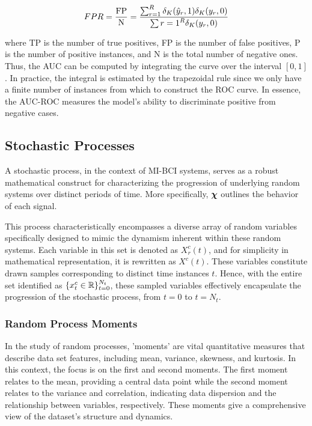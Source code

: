 \begin{equation}
    FPR = \frac{\text{FP}}{\text{N}} = \frac{\sum_{r=1}^{R} \delta_{K}( \hat{y}_r ,  1 )\delta_{K}( y_r , 0 )}{\sum{r=1}^{R} \delta_{K}( y_r , 0 )}
\end{equation}

where TP is the number of true positives, FP is the number of false positives, P is the number of positive instances, and N is the total number of negative ones. Thus, the AUC can be computed by integrating the curve over the interval $[0,1]$. In practice, the integral is estimated by the trapezoidal rule since we only have a finite number of instances from which to construct the ROC curve. In essence, the AUC-ROC measures the model's ability to discriminate positive from negative cases.

\subsection{Stochastic Processes}

A stochastic process, in the context of MI-BCI systems, serves as a robust mathematical construct for characterizing the progression of underlying random systems over distinct periods of time. More specifically, $\bm {\chi}$ outlines the behavior of each signal. 

This process characteristically encompasses a diverse array of random variables specifically designed to mimic the dynamism inherent within these random systems. Each variable in this set is denoted as $X^c_r(t)$, and for simplicity in mathematical representation, it is rewritten as $X^c(t)$. These variables constitute drawn samples corresponding to distinct time instances $t$. Hence, with the entire set identified as $\{{x}^{c}_{t} \in \mathbb{R}\}_{t=0}^{N_t}$, these sampled variables effectively encapsulate the progression of the stochastic process, from $t=0$ to $t=N_t$.

\subsubsection{Random Process Moments}
 
In the study of random processes, 'moments' are vital quantitative measures that describe data set features, including mean, variance, skewness, and kurtosis. In this context, the focus is on the first and second moments. The first moment relates to the mean, providing a central data point while the second moment relates to the variance and correlation, indicating data dispersion and the relationship between variables, respectively. These moments give a comprehensive view of the dataset's structure and dynamics.

